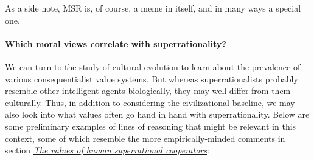 As a side note, MSR is, of course, a meme in itself, and in many ways a
special one.

\paragraph{Which moral views correlate with
superrationality?}\label{which-moral-views-correlate-with-superrationality}

We can turn to the study of cultural evolution to learn about the
prevalence of various consequentialist value systems. But whereas
superrationalists probably resemble other intelligent agents
biologically, they may well differ from them culturally. Thus, in
addition to considering the civilizational baseline, we may also look
into what values often go hand in hand with superrationality. Below are
some preliminary examples of lines of reasoning that might be relevant
in this context, some of which resemble the more empirically-minded
comments in section \protect\hyperlink{_ajbyis4djm7b}{\emph{The values
of human superrational cooperators}}:

